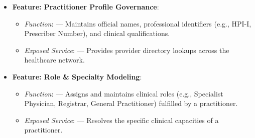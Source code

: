 \begin{itemize}
\begin{itemize}
\begin{itemize}
\item
\emph{Function}: \texttt{} — Validates national registration, specialty endorsements, and disciplinary sanctions against regulatory registries (e.g., AHPRA).



\item
\emph{Exposed Service}: \texttt{} — Discloses verified registration and status to credentialing and clinical systems.



\item
\emph{Governed Process}: \textbf{Practitioner Verification Process}.



\end{itemize}


\item
\textbf{Feature: Practitioner Profile Governance}:


\begin{itemize}

\item
\emph{Function}: \texttt{} — Maintains official names, professional identifiers (e.g., HPI-I, Prescriber Number), and clinical qualifications.



\item
\emph{Exposed Service}: \texttt{} — Provides provider directory lookups across the healthcare network.



\end{itemize}


\item
\textbf{Feature: Role \& Specialty Modeling}:


\begin{itemize}

\item
\emph{Function}: \texttt{} — Assigns and maintains clinical roles (e.g., Specialist Physician, Registrar, General Practitioner) fulfilled by a practitioner.



\item
\emph{Exposed Service}: \texttt{} — Resolves the specific clinical capacities of a practitioner.




\end{itemize}
\end{itemize}
\end{itemize}
